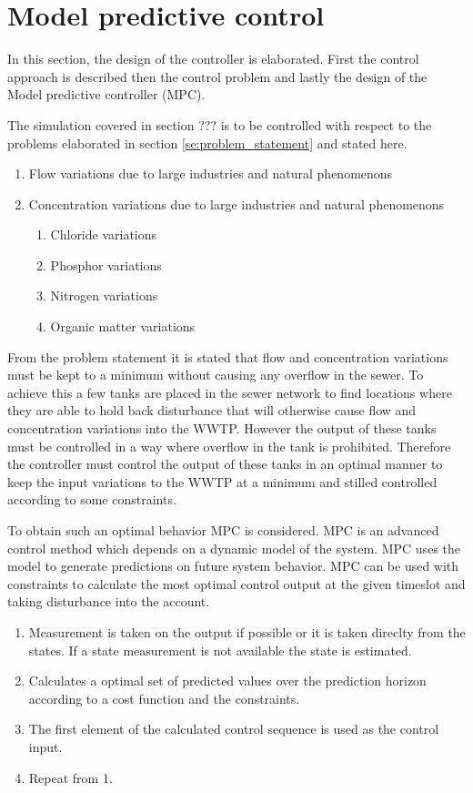 \section{Model predictive control}\label{se:model_predictive_control}
In this section, the design of the controller is elaborated. First the control approach is described then the control problem and lastly the design of the Model predictive controller (MPC). 

The simulation covered in section ??? is to be controlled with respect to the problems elaborated in section \ref{se:problem_statement} and stated here. 
\begin{enumerate}
\item Flow variations due to large industries and natural phenomenons
\item Concentration variations due to large industries and natural phenomenons
\begin{enumerate}
	\item Chloride variations
	\item Phosphor variations
	\item Nitrogen variations
	\item Organic matter variations
\end{enumerate}
\end{enumerate}

From the problem statement it is stated that flow and concentration variations must be kept to a minimum without causing any overflow in the sewer. To achieve this a few tanks are placed in the sewer network to find locations where they are able to hold back disturbance that will otherwise cause flow and concentration variations into the WWTP. However the output of these tanks must be controlled in a way where overflow in the tank is prohibited. Therefore the controller must control the output of these tanks in an optimal manner to keep the input variations to the WWTP at a minimum and stilled controlled according to some constraints.

To obtain such an optimal behavior MPC is considered. MPC is an advanced control method which depends on a dynamic model of the system. MPC uses the model to generate predictions on future system behavior. MPC can be used with constraints to calculate the most optimal control output at the given timeslot and taking disturbance into the account. 

\begin{enumerate}
       	\item Measurement is taken on the output if possible or it is taken direclty from the states. If a state measurement is not available the state is estimated.
       	\item Calculates a optimal set of predicted values over the prediction horizon according to a cost function and the constraints.
       	\item The first element of the calculated control sequence is used as the control input.
       	\item Repeat from 1.
\end{enumerate}       

